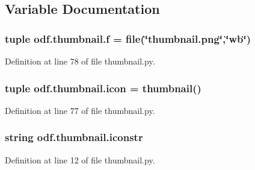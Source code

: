\subsection{Variable Documentation}
\hypertarget{namespaceodf_1_1thumbnail_a18c844ff9af982f46f8fff3d057abf88}{
\subsubsection[{f}]{\setlength{\rightskip}{0pt plus 5cm}tuple odf.\+thumbnail.\+f = file(\char`\"{}thumbnail.\+png\char`\"{},\char`\"{}wb\char`\"{})}}\label{namespaceodf_1_1thumbnail_a18c844ff9af982f46f8fff3d057abf88}


Definition at line 78 of file thumbnail.\+py.

\hypertarget{namespaceodf_1_1thumbnail_ae46cef71b644c712655bf3a4c9aee6f9}{
\subsubsection[{icon}]{\setlength{\rightskip}{0pt plus 5cm}tuple odf.\+thumbnail.\+icon = {\bf thumbnail}()}}\label{namespaceodf_1_1thumbnail_ae46cef71b644c712655bf3a4c9aee6f9}


Definition at line 77 of file thumbnail.\+py.

\hypertarget{namespaceodf_1_1thumbnail_a5c6ae7d3b8d83dac7bc938e49de53b95}{
\subsubsection[{iconstr}]{\setlength{\rightskip}{0pt plus 5cm}string odf.\+thumbnail.\+iconstr}}\label{namespaceodf_1_1thumbnail_a5c6ae7d3b8d83dac7bc938e49de53b95}


Definition at line 12 of file thumbnail.\+py.

